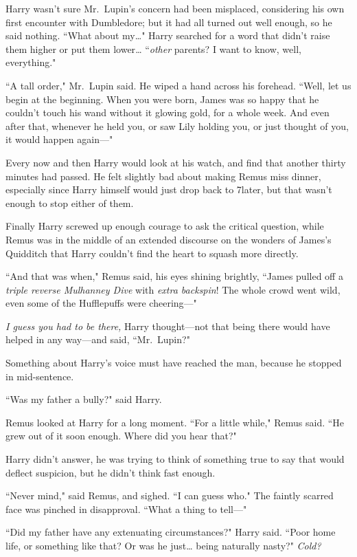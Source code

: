 Harry wasn't sure Mr.~Lupin's concern had been misplaced, considering his own first encounter with Dumbledore; but it had all turned out well enough, so he said nothing. ``What about my{\ldots}" Harry searched for a word that didn't raise them higher or put them lower{\ldots} ``\emph{other} parents? I want to know, well, everything."

``A tall order," Mr.~Lupin said. He wiped a hand across his forehead. ``Well, let us begin at the beginning. When you were born, James was so happy that he couldn't touch his wand without it glowing gold, for a whole week. And even after that, whenever he held you, or saw Lily holding you, or just thought of you, it would happen again—"

\later

Every now and then Harry would look at his watch, and find that another thirty minutes had passed. He felt slightly bad about making Remus miss dinner, especially since Harry himself would just drop back to 7\pm later, but that wasn't enough to stop either of them.

Finally Harry screwed up enough courage to ask the critical question, while Remus was in the middle of an extended discourse on the wonders of James's Quidditch that Harry couldn't find the heart to squash more directly.

``And that was when," Remus said, his eyes shining brightly, ``James pulled off a \emph{triple reverse Mulhanney Dive} with \emph{extra backspin}! The whole crowd went wild, even some of the Hufflepuffs were cheering—"

\emph{I guess you had to be there,} Harry thought—not that being there would have helped in any way—and said, ``Mr.~Lupin?"

Something about Harry's voice must have reached the man, because he stopped in mid-sentence.

``Was my father a bully?" said Harry.

Remus looked at Harry for a long moment. ``For a little while," Remus said. ``He grew out of it soon enough. Where did you hear that?"

Harry didn't answer, he was trying to think of something true to say that would deflect suspicion, but he didn't think fast enough.

``Never mind," said Remus, and sighed. ``I can guess who." The faintly scarred face was pinched in disapproval. ``What a thing to tell—"

``Did my father have any extenuating circumstances?" Harry said. ``Poor home life, or something like that? Or was he just{\ldots} being naturally nasty?" \emph{Cold?}

